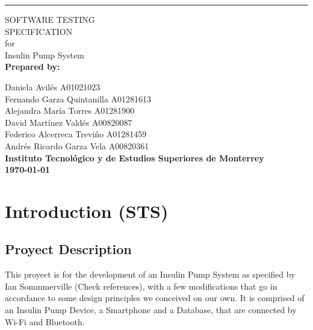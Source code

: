 \documentclass{scrreprt}
\begin{document}
\clearpage
\begin{flushright}
    \rule{16cm}{5pt}\vskip1cm
    \begin{bfseries}
        \Huge{SOFTWARE TESTING\\ SPECIFICATION}\\
        \vspace{1cm}
        for\\
        \vspace{1cm}
        Insulin Pump System\\
        \vspace{2cm}
        \Large \textbf{Prepared by:}\\
    \end{bfseries}
        \Large
            Daniela Avil\'{e}s A01021023\\
            Fernando Garza Quintanilla A01281613\\
            Alejandra María Torres A01281900\\
            David Martínez Vald\'{e}s A00820087\\
            Federico Alcerreca Treviño A01281459\\
            Andr\'{e}s Ricardo Garza Vela A00820361\\
        \vspace{2cm}
        \textbf{\Large Instituto Tecnológico y de Estudios Superiores de Monterrey}\\
        \vspace{2cm}
        \textbf{\today}\\
\end{flushright}

\chapter{Introduction (STS)}
\section{Proyect Description}
This proyect is for the development of an Insulin Pump System as specified by Ian Sommmerville (Check references), with a few modifications that go in accordance to some design principles we conceived on our own. It
is comprised of an Insulin Pump Device, a Smartphone and a Database, that are connected by Wi-Fi and Bluetooth.
\end{document}
